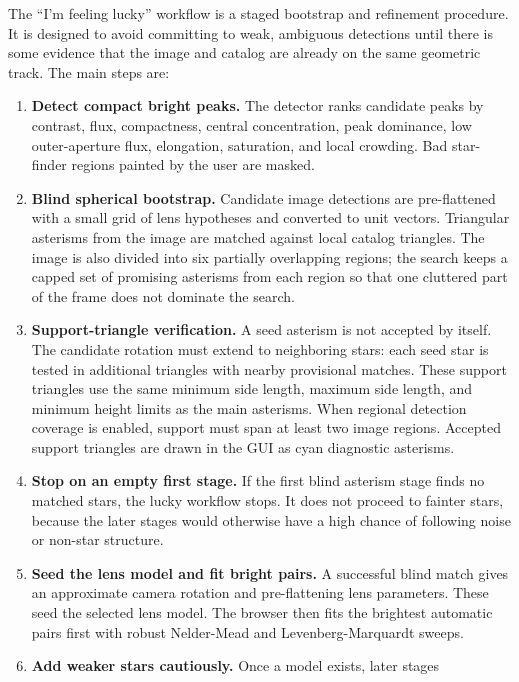 \documentclass[11pt]{article}
\begin{document}
The ``I'm feeling lucky'' workflow is a staged bootstrap and refinement
procedure. It is designed to avoid committing to weak, ambiguous detections
until there is some evidence that the image and catalog are already on the
same geometric track. The main steps are:
\begin{enumerate}
  \item \textbf{Detect compact bright peaks.} The detector ranks candidate
        peaks by contrast, flux, compactness, central concentration, peak
        dominance, low outer-aperture flux, elongation, saturation, and local
        crowding. Bad star-finder regions painted by the user are masked.
  \item \textbf{Blind spherical bootstrap.} Candidate image detections are
        pre-flattened with a small grid of lens hypotheses and converted to
        unit vectors. Triangular asterisms from the image are matched against
        local catalog triangles. The image is also divided into six partially
        overlapping regions; the search keeps a capped set of promising
        asterisms from each region so that one cluttered part of the frame
        does not dominate the search.
  \item \textbf{Support-triangle verification.} A seed asterism is not accepted
        by itself. The candidate rotation must extend to neighboring stars:
        each seed star is tested in additional triangles with nearby provisional
        matches. These support triangles use the same minimum side length,
        maximum side length, and minimum height limits as the main asterisms.
        When regional detection coverage is enabled, support must span at
        least two image regions. Accepted support triangles are drawn in the
        GUI as cyan diagnostic asterisms.
  \item \textbf{Stop on an empty first stage.} If the first blind asterism
        stage finds no matched stars, the lucky workflow stops. It does not
        proceed to fainter stars, because the later stages would otherwise have
        a high chance of following noise or non-star structure.
  \item \textbf{Seed the lens model and fit bright pairs.} A successful blind
        match gives an approximate camera rotation and pre-flattening lens
        parameters. These seed the selected lens model. The browser then fits
        the brightest automatic pairs first with robust Nelder-Mead and
        Levenberg-Marquardt sweeps.
  \item \textbf{Add weaker stars cautiously.} Once a model exists, later stages

\end{enumerate}
\end{document}
